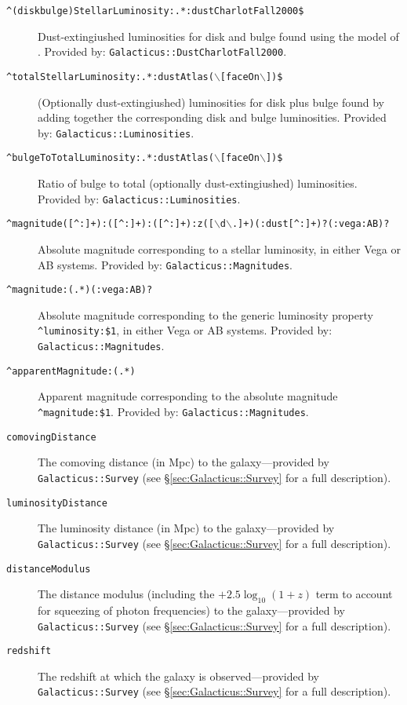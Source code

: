 \begin{description}
 \item[{\tt \textasciicircum(disk\textbar bulge)StellarLuminosity:.*:dustCharlotFall2000\$}] Dust-extingiushed luminosities for disk and bulge found using the model of \cite{charlot_simple_2000}. Provided by: {\tt Galacticus::DustCharlotFall2000}.
 \item[{\tt \textasciicircum totalStellarLuminosity:.*:dustAtlas($\backslash$[faceOn$\backslash$])\$}] (Optionally dust-extingiushed) luminosities for disk plus bulge found by adding together the corresponding disk and bulge luminosities. Provided by: {\tt Galacticus::Luminosities}.
 \item[{\tt \textasciicircum bulgeToTotalLuminosity:.*:dustAtlas($\backslash$[faceOn$\backslash$])\$}] Ratio of bulge to total (optionally dust-extingiushed) luminosities. Provided by: {\tt Galacticus::Luminosities}.
 \item[{\tt \textasciicircum magnitude([\textasciicircum :]+):([\textasciicircum :]+):([\textasciicircum :]+):z([$\backslash$d$\backslash$.]+)(:dust[\textasciicircum :]+)?(:vega\textbar :AB)?}] Absolute magnitude corresponding to a stellar luminosity, in either Vega or AB systems. Provided by: {\tt Galacticus::Magnitudes}.
 \item[{\tt \textasciicircum magnitude:(.*)(:vega\textbar :AB)?}] Absolute magnitude corresponding to the generic luminosity property {\tt \textasciicircum luminosity:\$1}, in either Vega or AB systems. Provided by: {\tt Galacticus::Magnitudes}.
 \item[{\tt \textasciicircum apparentMagnitude:(.*)}] Apparent magnitude corresponding to the absolute magnitude {\tt \textasciicircum magnitude:\$1}. Provided by: {\tt Galacticus::Magnitudes}.
 \item[{\tt comovingDistance}] The comoving distance (in Mpc) to the galaxy---provided by {\tt Galacticus::Survey} (see \S\ref{sec:Galacticus::Survey} for a full description).
 \item[{\tt luminosityDistance}] The luminosity distance (in Mpc) to the galaxy---provided by {\tt Galacticus::Survey} (see \S\ref{sec:Galacticus::Survey} for a full description).
 \item[{\tt distanceModulus}] The distance modulus (including the $+2.5\log_{10}(1+z)$ term to account for squeezing of photon frequencies) to the galaxy---provided by {\tt Galacticus::Survey} (see \S\ref{sec:Galacticus::Survey} for a full description).
 \item[{\tt redshift}] The redshift at which the galaxy is observed---provided by {\tt Galacticus::Survey} (see \S\ref{sec:Galacticus::Survey} for a full description).

\end{description}
